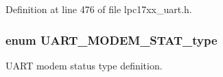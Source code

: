 Definition at line 476 of file lpc17xx\+\_\+uart.\+h.

\subsubsection[{\texorpdfstring{U\+A\+R\+T\+\_\+\+M\+O\+D\+E\+M\+\_\+\+S\+T\+A\+T\+\_\+type}{UART_MODEM_STAT_type}}]{\setlength{\rightskip}{0pt plus 5cm}enum {\bf U\+A\+R\+T\+\_\+\+M\+O\+D\+E\+M\+\_\+\+S\+T\+A\+T\+\_\+type}}\hypertarget{group___u_a_r_t___public___types_ga2f7d223e1fdf6018ff08109bb1c976ef}{}\label{group___u_a_r_t___public___types_ga2f7d223e1fdf6018ff08109bb1c976ef}


U\+A\+RT modem status type definition. 

